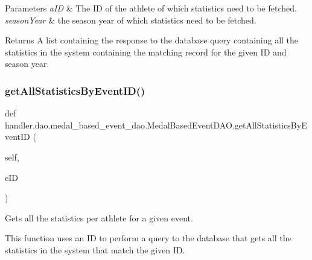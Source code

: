\begin{DoxyParams}{Parameters}
{\em a\+ID} & The ID of the athlete of which statistics need to be fetched. \\
\hline
{\em season\+Year} & the season year of which statistics need to be fetched.\\
\hline
\end{DoxyParams}
\begin{DoxyReturn}{Returns}
A list containing the response to the database query containing all the statistics in the system containing the matching record for the given ID and season year. 
\end{DoxyReturn}
\mbox{\label{classhandler_1_1dao_1_1medal__based__event__dao_1_1_medal_based_event_d_a_o_ab30d66af48d9773136c2fc2e280e2d18}} 
\subsubsection{\texorpdfstring{get\+All\+Statistics\+By\+Event\+I\+D()}{getAllStatisticsByEventID()}}
{\footnotesize\ttfamily def handler.\+dao.\+medal\+\_\+based\+\_\+event\+\_\+dao.\+Medal\+Based\+Event\+D\+A\+O.\+get\+All\+Statistics\+By\+Event\+ID (\begin{DoxyParamCaption}\item[{}]{self,  }\item[{}]{e\+ID }\end{DoxyParamCaption})}



Gets all the statistics per athlete for a given event. 

This function uses an ID to perform a query to the database that gets all the statistics in the system that match the given ID.


